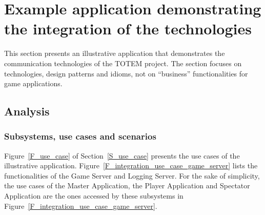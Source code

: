 

\section{Example application demonstrating the integration of the technologies}
\label{S_integration}

This section presents an illustrative application that demonstrates
the communication technologies of the TOTEM project. The section
focuses on technologies, design patterns and idioms, not on
``business'' functionalities for game applications.

\subsection{Analysis}
\label{SS_integration_analysis}

\subsubsection{Subsystems, use cases and scenarios}
\label{SSS_integration_subsystems}

Figure~\ref{F_use_case} of Section~\ref{S_use_case} presents the use
cases of the illustrative application.
Figure~\ref{F_integration_use_case_game_server} lists the
functionalities of the \textsf{Game Server} and \textsf{Logging
  Server}. For the sake of simplicity, the use cases of the
\textsf{Master Application}, the \textsf{Player Application} and
\textsf{Spectator Application} are the ones accessed by these
subsystems in Figure~\ref{F_integration_use_case_game_server}.

